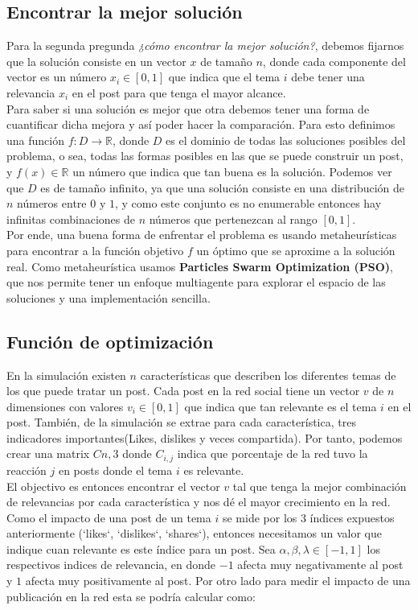 \documentclass[acmtog]{acmart}
\begin{document}
\subsection{Encontrar la mejor solución}

Para la segunda pregunda \textit{¿cómo encontrar la mejor solución?}, debemos fijarnos que la solución consiste en un vector $x$ de tamaño $n$, donde cada componente del vector es un número $x_i \in [0,1]$ que
indica que el tema $i$ debe tener una relevancia $x_i$ en el post para que tenga el mayor alcance.
\\
Para saber si una solución es mejor que otra debemos tener una forma de cuantificar dicha mejora y así poder hacer la comparación. Para esto definimos una función $f: D \rightarrow \mathbb{R}$, donde $D$ es
el dominio de todas las soluciones posibles del problema, o sea, todas las formas posibles en las que se puede construir un post, y $f(x) \in \mathbb{R}$ un número que indica que tan buena es la solución. 
Podemos ver que $D$ es de tamaño infinito, ya que una solución consiste en una distribución de $n$ números entre $0$ y $1$, y como este conjunto es no enumerable entonces hay infinitas combinaciones de $n$ números
que pertenezcan al rango $[0, 1]$.
\\
Por ende, una buena forma de enfrentar el problema es usando metaheurísticas para encontrar a la función objetivo $f$ un óptimo que se aproxime a la solución real. Como metaheurística usamos \textbf{Particles Swarm Optimization (PSO)}, que nos permite tener un enfoque multiagente para explorar el espacio de las soluciones y una implementación sencilla.

\subsection{Función de optimización}

En la simulación existen $n$ características que describen los diferentes temas de los que puede tratar un post. Cada post en la red social tiene un vector $v$ de $n$ dimensiones con valores $v_i \in [0, 1]$ que indica que tan relevante es el tema $i$ en el post.
También, de la simulación se extrae para cada característica, tres indicadores importantes(Likes, dislikes y veces compartida). Por tanto, podemos crear una matrix $C{n,3}$ donde $C_{i,j}$ indica que porcentaje de la red tuvo la reacción $j$ en posts donde el tema $i$ es relevante.
\\
El objectivo es entonces encontrar el vector $v$ tal que tenga la mejor combinación de relevancias por cada característica y nos dé el mayor crecimiento en la red. Como el impacto de una post de un tema $i$ se mide por los 3 índices expuestos anteriormente (`likes`, `dislikes`, `shares`), 
entonces necesitamos un valor que indique cuan relevante es este índice para un post. Sea $\alpha, \beta, \lambda \in [-1, 1]$ los respectivos indices de relevancia, en donde $-1$ afecta muy negativamente al post y $1$ afecta muy positivamente al post.
Por otro lado para medir el impacto de una publicación en la red esta se podría calcular como:
\end{document}
